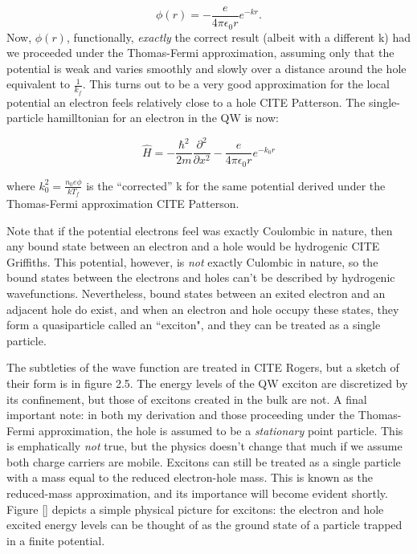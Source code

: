 \begin{equation}
\phi(r) = -\frac{e}{4\pi \epsilon_0 r} e^{-k r}.
\end{equation}
\indent Now, $\phi(r)$, functionally, \textit{exactly} the correct result (albeit with a different k) had we proceeded under the Thomas-Fermi approximation, assuming only that the potential is weak and varies smoothly and slowly over a distance around the hole equivalent to $\frac{1}{k_f}$. This turns out to be a very good approximation for the local potential an electron feels relatively close to a hole CITE Patterson. The single-particle hamilltonian for an electron in the QW is now:

\begin{equation}
\hat{H} = - \frac{\hbar^2}{2m} \frac{\partial^2}{\partial x^2} - \frac{e}{4\pi \epsilon_0 r} e^{-k_0 r}
\end{equation}

where $k_0^2 = \frac{n_0 e\phi}{k T_f}$ is the ``corrected'' k for the same potential derived under the Thomas-Fermi approximation CITE Patterson. 

\indent Note that if the potential electrons feel was exactly Coulombic in nature, then any bound state between an electron and a hole would be hydrogenic CITE Griffiths. This potential, however, is \textit{not} exactly Culombic in nature, so the bound states between the electrons and holes can't be described by hydrogenic wavefunctions. Nevertheless, bound states between an exited electron and an adjacent hole do exist, and when an electron and hole occupy these states, they form a quasiparticle called an ``exciton", and they can be treated as a single particle.

\indent The subtleties of the wave function are treated in CITE Rogers, but a sketch of their form is in figure 2.5. The energy levels of the QW exciton are discretized by its confinement, but those of excitons created in the bulk are not. A final important note: in both my derivation and those proceeding under the Thomas-Fermi approximation, the hole is assumed to be a \textit{stationary} point particle. This is emphatically \textit{not} true, but the physics doesn't change that much if we assume both charge carriers are mobile. Excitons can still be treated as a single particle with a mass equal to the reduced electron-hole mass. This is known as the reduced-mass approximation, and its importance will become evident shortly. Figure \ref{} depicts a simple physical picture for excitons: the electron and hole excited energy levels can be thought of as the ground state of a particle trapped in a finite potential.  

